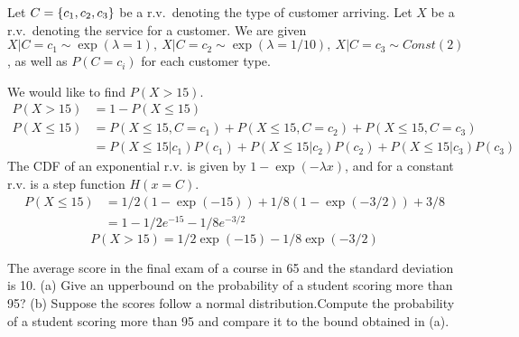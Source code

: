 \documentclass{article}
\begin{document}
    \begin{solution}
        Let $C = \{c_1, c_2, c_3\}$ be a r.v.~denoting the type of customer arriving. Let $X$ be a r.v.~denoting the service for a customer. We are given $X | C = c_1 \sim \exp(\lambda=1), \ X | C = c_2 \sim \exp(\lambda=1/10), \ X | C = c_3 \sim Const(2)$, as well as $P(C = c_i)$ for each customer type.

        We would like to find $P(X > 15)$.
        \begin{align*}
            P(X > 15) &= 1 - P(X \leq 15) \\
            P(X \leq 15) &= P(X \leq 15, C = c_1) + P(X \leq 15, C = c_2) + P(X \leq 15, C = c_3) \\
            &= P(X \leq 15|c_1)P(c_1) + P(X \leq 15|c_2)P(c_2) + P(X \leq 15|c_3)P(c_3)
        \end{align*}
        The CDF of an exponential r.v. is given by $1 - \exp(-\lambda x)$, and for a constant r.v. is a step function $H(x = C)$.
        \begin{align*}
            P(X \leq 15) &= 1/2(1 - \exp(-15)) + 1/8(1 - \exp(-3/2)) + 3/8 \\
            &= 1 - 1/2e^{-15} - 1/8e^{-3/2}
        \end{align*}
        \begin{equation}
            P(X > 15) = 1/2 \exp(-15) - 1/8 \exp(-3/2)
        \end{equation}
        
    \end{solution}

    \nextproblem
    \begin{problem}
        The average score in the final exam of a course in 65 and the standard deviation is 10. (a) Give an upperbound on the probability of a student scoring more than 95? (b) Suppose the scores follow a normal distribution.Compute the probability of a student scoring more than 95 and compare it to the bound obtained in (a).
    \end{problem}
\end{document}
